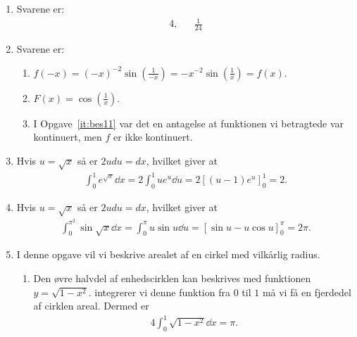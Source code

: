 \begin{enumerate}
	\item Svarene er:
	\begin{align*}
	4,&& \frac{1}{24}
	\end{align*}
	
	\item Svarene er:
	\begin{enumerate}
		\item $f(-x)=(-x)^{-2}\sin (\frac{1}{-x})=-x^{-2}\sin (\frac{1}{x})=f(x)$.
		\item $F(x)=\cos(\frac{1}{x})$. 
		\item I Opgave~\ref{it:bes11} var det en antagelse at funktionen vi betragtede var kontinuert, men $f$ er ikke kontinuert.
	\end{enumerate} 
	
	\item Hvis $u=\sqrt{x}$ så er $2u du=dx$, hvilket giver at
	\begin{align*}
	\int_0^1e^{\sqrt{x}}\dd x=2\int_0^1 ue^u\dd u=2[(u-1)e^u]_0^1=2.
	\end{align*}

	\item Hvis $u=\sqrt{x}$ så er $2u du=dx$, hvilket giver at
	\begin{align*}
	\int_0^{\pi^2} \sin\sqrt{x}\dd x =\int_0^\pi u\sin u\dd u=[\sin u-u\cos u]_0^\pi=2\pi.
	\end{align*}
	
	\item\label{it:bes2ans} I denne opgave vil vi beskrive arealet af en cirkel med vilkårlig radius.
	\begin{enumerate}
		\item Den øvre halvdel af enhedscirklen kan beskrives med funktionen $y=\sqrt{1-x^2}$. integrerer vi denne funktion fra $0$ til $1$ må vi få en fjerdedel af cirklen areal. Dermed er
		\begin{align*}
		4\int_0^1 \sqrt{1-x^2}\dd x=\pi.
		\end{align*}


\end{enumerate}
\end{enumerate}
